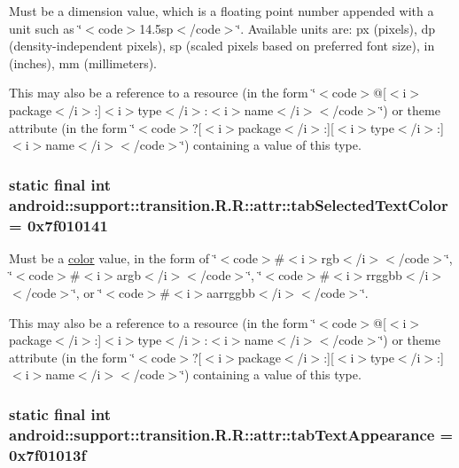 Must be a dimension value, which is a floating point number appended with a unit such as \char`\"{}$<$code$>$14.5sp$<$/code$>$\char`\"{}. Available units are: px (pixels), dp (density-independent pixels), sp (scaled pixels based on preferred font size), in (inches), mm (millimeters). 

This may also be a reference to a resource (in the form \char`\"{}$<$code$>$@\mbox{[}$<$i$>$package$<$/i$>$:\mbox{]}$<$i$>$type$<$/i$>$:$<$i$>$name$<$/i$>$$<$/code$>$\char`\"{}) or theme attribute (in the form \char`\"{}$<$code$>$?\mbox{[}$<$i$>$package$<$/i$>$:\mbox{]}\mbox{[}$<$i$>$type$<$/i$>$:\mbox{]}$<$i$>$name$<$/i$>$$<$/code$>$\char`\"{}) containing a value of this type. \hypertarget{classandroid_1_1support_1_1transition_1_1_r_1_1attr_38f72ab26101848dba567bed67b03f95}{
\subsubsection[{tabSelectedTextColor}]{\setlength{\rightskip}{0pt plus 5cm}static final int android::support::transition.R.R::attr::tabSelectedTextColor = 0x7f010141}}
\label{classandroid_1_1support_1_1transition_1_1_r_1_1attr_38f72ab26101848dba567bed67b03f95}


Must be a \hyperlink{classandroid_1_1support_1_1transition_1_1_r_1_1color}{color} value, in the form of \char`\"{}$<$code$>$\#$<$i$>$rgb$<$/i$>$$<$/code$>$\char`\"{}, \char`\"{}$<$code$>$\#$<$i$>$argb$<$/i$>$$<$/code$>$\char`\"{}, \char`\"{}$<$code$>$\#$<$i$>$rrggbb$<$/i$>$$<$/code$>$\char`\"{}, or \char`\"{}$<$code$>$\#$<$i$>$aarrggbb$<$/i$>$$<$/code$>$\char`\"{}. 

This may also be a reference to a resource (in the form \char`\"{}$<$code$>$@\mbox{[}$<$i$>$package$<$/i$>$:\mbox{]}$<$i$>$type$<$/i$>$:$<$i$>$name$<$/i$>$$<$/code$>$\char`\"{}) or theme attribute (in the form \char`\"{}$<$code$>$?\mbox{[}$<$i$>$package$<$/i$>$:\mbox{]}\mbox{[}$<$i$>$type$<$/i$>$:\mbox{]}$<$i$>$name$<$/i$>$$<$/code$>$\char`\"{}) containing a value of this type. \hypertarget{classandroid_1_1support_1_1transition_1_1_r_1_1attr_7bf19ed3adce8b34cd5cdbce8049b770}{
\subsubsection[{tabTextAppearance}]{\setlength{\rightskip}{0pt plus 5cm}static final int android::support::transition.R.R::attr::tabTextAppearance = 0x7f01013f}}
\label{classandroid_1_1support_1_1transition_1_1_r_1_1attr_7bf19ed3adce8b34cd5cdbce8049b770}


